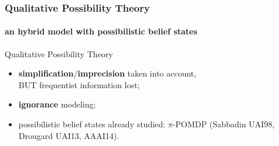 \documentclass[12pt,svgnames,table]{beamer}
\begin{document}
\begin{frame}
\frametitle{Qualitative Possibility Theory}
\framesubtitle{\footnotesize an hybrid model with possibilistic belief states}
\begin{block}{Qualitative Possibility Theory}
\begin{itemize}
\item \textbf{simplification}/\textbf{imprecision} taken into account,\\
{\color{red} BUT frequentist information lost};
\item \textbf{ignorance} modeling;
\item possibilistic belief states already studied: $\pi$-POMDP (Sabbadin UAI98, Drougard UAI13, AAAI14).
\end{itemize}
\end{block}
\end{frame}
\end{document}
